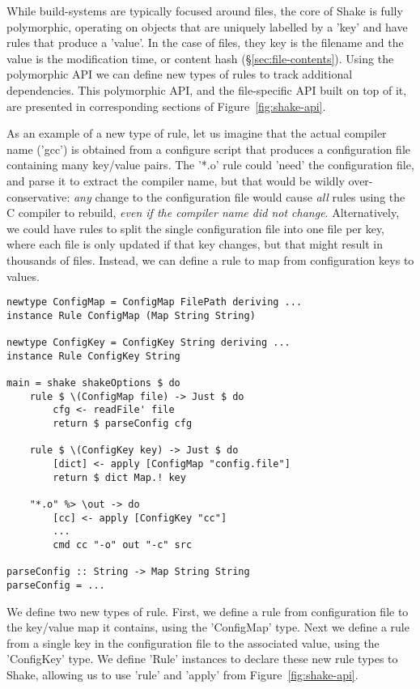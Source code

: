 While build-systems are typically focused around files, the core of Shake is
fully polymorphic, operating on objects that are uniquely labelled by a
\lst'key' and have rules that produce a \lst'value'.
In the case of files, they key is the filename and the value is the modification 
time, or content hash (\S\ref{sec:file-contents}).
Using the polymorphic API we can define new types of rules to track additional
dependencies.
This polymorphic API, and the file-specific API built on top
of it, are presented in corresponding sections of Figure~\ref{fig:shake-api}.

As an example of a new type of rule, let us imagine that the actual compiler
name (\lst'gcc') is obtained from a configure script that produces a
configuration file containing many key/value pairs. The \lst'*.o' rule could
\lst'need' the configuration file, and parse it to extract the compiler name,
but that would be wildly over-conservative: \emph{any} change to the
configuration file would cause \emph{all} rules using the C compiler to rebuild, 
\emph{even if the compiler name did not change}. Alternatively, we could have rules to split
the single configuration file into one file per key, where each file is only
updated if that key changes, but that might result in thousands of files.
Instead, we can define a rule to map from configuration keys to values.

\begin{lstlisting}
newtype ConfigMap = ConfigMap FilePath deriving ...
instance Rule ConfigMap (Map String String)

newtype ConfigKey = ConfigKey String deriving ...
instance Rule ConfigKey String

main = shake shakeOptions $ do
    rule $ \(ConfigMap file) -> Just $ do
        cfg <- readFile' file
        return $ parseConfig cfg

    rule $ \(ConfigKey key) -> Just $ do
        [dict] <- apply [ConfigMap "config.file"]
        return $ dict Map.! key

    "*.o" %> \out -> do
        [cc] <- apply [ConfigKey "cc"]
        ...
        cmd cc "-o" out "-c" src

parseConfig :: String -> Map String String
parseConfig = ...
\end{lstlisting}
\noindent We define two new types of rule. First, we define a rule from
configuration file to the key/value map it contains, using the
\lst'ConfigMap' type. Next we define a rule from a single key in the configuration file to the associated value,
using the \lst'ConfigKey' type. We define \lst'Rule' instances to declare these
new rule types to Shake, allowing us to use \lst'rule' and \lst'apply' from
Figure~\ref{fig:shake-api}.


